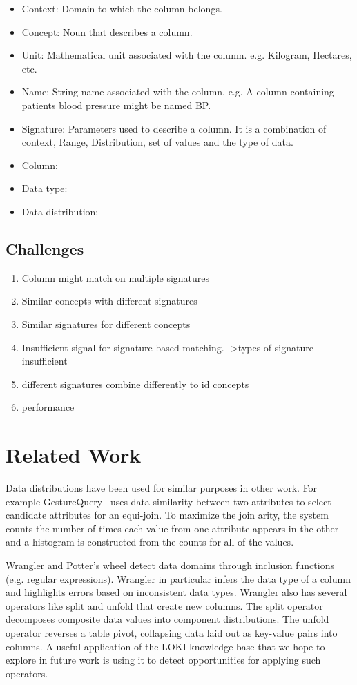 \documentclass{vldb}
\begin{document}
\begin{itemize}
	\item Context: Domain to which the column belongs.
	\item Concept: Noun that describes a column.
	\item Unit: Mathematical unit associated with the column. e.g. Kilogram, Hectares, etc.
	\item Name: String name associated with the column. e.g. A column containing patients blood pressure might be named BP.
	\item Signature: Parameters used to describe a column. It is a combination of context, Range, Distribution, set of values and the type of data.
	\item Column: 
	\item Data type:
	\item Data distribution:
\end{itemize}

\subsection{Challenges}
\begin{enumerate}
	\item Column might match on multiple signatures
	\item Similar concepts with different signatures
	\item Similar signatures for different concepts
	\item Insufficient signal for signature based matching.
	->types of signature insufficient
	\item different signatures combine differently to id concepts
	\item performance
\end{enumerate}

\section{Related Work}
Data distributions have been used for similar purposes in other work.  
For example GestureQuery~\cite{nandi2013gestural} uses data similarity between two attributes to select candidate attributes for an equi-join.  
To maximize the join arity, the system counts the number of times each value from one attribute appears in the other and a histogram is constructed from the counts for all of the values.

Wrangler \cite{kandel2011wrangler} and Potter's wheel \cite{raman2001potter} detect data domains through inclusion functions (e.g. regular expressions).
Wrangler in particular infers the data type of a column and highlights errors based on inconsistent data types. 
Wrangler also has several operators like split and unfold that create new columns.
The split operator decomposes composite data values into component distributions.  
The unfold operator reverses a table pivot, collapsing data laid out as key-value pairs into columns.  
A useful application of the LOKI knowledge-base that we hope to explore in future work is using it to detect opportunities for applying such operators.
\end{document}
